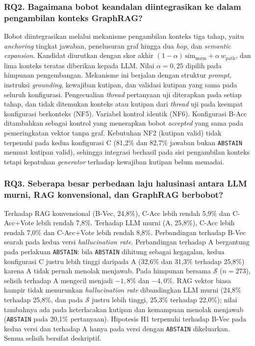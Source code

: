 \subsubsection*{RQ2. Bagaimana bobot keandalan diintegrasikan ke dalam pengambilan konteks GraphRAG?}

Bobot diintegrasikan melalui mekanisme pengambilan konteks tiga tahap, yaitu \emph{anchoring} tingkat jawaban, penelusuran graf hingga dua \emph{hop}, dan \emph{semantic expansion}. Kandidat diurutkan dengan skor akhir $(1-\alpha)\,\mathrm{sim}_{\mathrm{norm}}+\alpha\,w_{\mathrm{path}}$, dan lima konteks teratas diberikan kepada LLM. Nilai $\alpha=0{,}25$ dipilih pada himpunan pengembangan. Mekanisme ini berjalan dengan struktur \emph{prompt}, instruksi \emph{grounding}, kewajiban kutipan, dan validasi kutipan yang sama pada seluruh konfigurasi. Pengecualian \emph{thread} pertanyaan uji diterapkan pada setiap tahap, dan tidak ditemukan konteks atau kutipan dari \emph{thread} uji pada keempat konfigurasi berkonteks (NF5). Variabel kontrol identik (NF6). Konfigurasi B-Acc ditambahkan sebagai kontrol yang menerapkan bobot \emph{accepted} yang sama pada pemeringkatan vektor tanpa graf. Kebutuhan NF2 (kutipan valid) tidak terpenuhi pada kedua konfigurasi C (81,2\% dan 82,7\% jawaban bukan \texttt{ABSTAIN} memuat kutipan valid), sehingga integrasi berhasil pada sisi pengambilan konteks tetapi kepatuhan \emph{generator} terhadap kewajiban kutipan belum memadai.

\subsubsection*{RQ3. Seberapa besar perbedaan laju halusinasi antara LLM murni, RAG konvensional, dan GraphRAG berbobot?}

Terhadap RAG konvensional (B-Vec, 24,8\%), C-Acc lebih rendah 5,9\% dan C-Acc+Vote lebih rendah 7,8\%. Terhadap LLM murni (A, 25,8\%), C-Acc lebih rendah 7,0\% dan C-Acc+Vote lebih rendah 8,8\%. Perbandingan terhadap B-Vec searah pada kedua versi \emph{hallucination rate}. Perbandingan terhadap A bergantung pada perlakuan \texttt{ABSTAIN}: bila \texttt{ABSTAIN} dihitung sebagai kegagalan, kedua konfigurasi C justru lebih tinggi daripada A (32,6\% dan 31,3\% terhadap 25,8\%) karena A tidak pernah menolak menjawab. Pada himpunan bersama $\mathcal{S}$ ($n=273$), selisih terhadap A mengecil menjadi $-1{,}8\%$ dan $-4{,}0\%$. RAG vektor biasa hampir tidak menurunkan \emph{hallucination rate} dibandingkan LLM murni (24,8\% terhadap 25,8\%, dan pada $\mathcal{S}$ justru lebih tinggi, 25,3\% terhadap 22,0\%); nilai tambahnya ada pada keterlacakan kutipan dan kemampuan menolak menjawab (\texttt{ABSTAIN} pada 20,1\% pertanyaan). Hipotesis H1 terpenuhi terhadap B-Vec pada kedua versi dan terhadap A hanya pada versi dengan \texttt{ABSTAIN} dikeluarkan. Semua selisih bersifat deskriptif.

